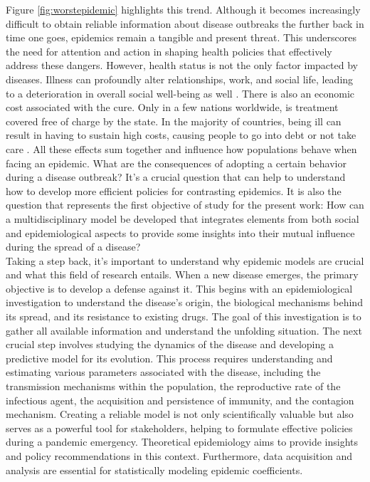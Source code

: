 Figure \ref{fig:worstepidemic} highlights this trend. Although it becomes increasingly difficult to obtain reliable information about disease outbreaks the further back in time one goes, epidemics remain a tangible and present threat. This underscores the need for attention and action in shaping health policies that effectively address these dangers.
However, health status is not the only factor impacted by diseases. Illness can profoundly alter relationships, work, and social life, leading to a deterioration in overall social well-being as well \cite{Yang_2020}. 
There is also an economic cost associated with the cure. Only in a few nations worldwide, is treatment covered free of charge by the state. In the majority of countries, being ill can result in having to sustain high costs, causing people to go into debt or not take care \cite{esteban_2017, Barlow2021}. 
All these effects sum together and influence how populations behave when facing an epidemic. What are the consequences of adopting a certain behavior during a disease outbreak? It's a crucial question that can help to understand how to develop more efficient policies for contrasting epidemics. It is also the question that represents the first objective of study for the present work: How can a multidisciplinary model be developed that integrates elements from both social and epidemiological aspects to provide some insights into their mutual influence during the spread of a disease?
\\
\newline
Taking a step back, it's important to understand why epidemic models are crucial and what this field of research entails.
When a new disease emerges, the primary objective is to develop a defense against it. This begins with an epidemiological investigation to understand the disease's origin, the biological mechanisms behind its spread, and its resistance to existing drugs. The goal of this investigation is to gather all available information and understand the unfolding situation.
The next crucial step involves studying the dynamics of the disease and developing a predictive model for its evolution. This process requires understanding and estimating various parameters associated with the disease, including the transmission mechanisms within the population, the reproductive rate of the infectious agent, the acquisition and persistence of immunity, and the contagion mechanism.
Creating a reliable model is not only scientifically valuable but also serves as a powerful tool for stakeholders, helping to formulate effective policies during a pandemic emergency. Theoretical epidemiology aims to provide insights and policy recommendations in this context. Furthermore, data acquisition and analysis are essential for statistically modeling epidemic coefficients. 
